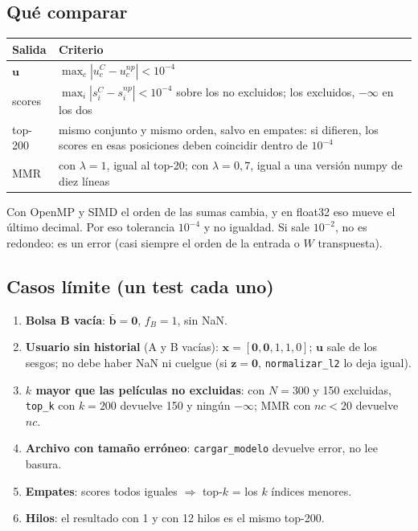 \documentclass[a4paper,11pt]{article}
\newcommand{\cod}[1]{\texttt{#1}}
\begin{document}
\subsection{Qué comparar}
\begin{center}
\begin{tabularx}{\linewidth}{lY}
\toprule
Salida & Criterio \\
\midrule
$\mathbf{u}$ & $\max_c |u^C_c - u^{np}_c| < 10^{-4}$ \\
scores & $\max_i |s^C_i - s^{np}_i| < 10^{-4}$ sobre los no excluidos; los excluidos, $-\infty$ en los dos \\
top-200 & mismo conjunto y mismo orden, salvo en empates: si difieren, los scores en esas posiciones deben coincidir dentro de $10^{-4}$ \\
MMR & con $\lambda = 1$, igual al top-20; con $\lambda = 0{,}7$, igual a una versión numpy de diez líneas \\
\bottomrule
\end{tabularx}
\end{center}
\begin{idea}
Con OpenMP y SIMD el orden de las sumas cambia, y en float32 eso mueve el último decimal. Por eso tolerancia $10^{-4}$
y no igualdad. Si sale $10^{-2}$, no es redondeo: es un error (casi siempre el orden de la entrada o $W$ transpuesta).
\end{idea}

\subsection{Casos límite (un test cada uno)}
\begin{enumerate}
  \item \textbf{Bolsa B vacía}: $\bar{\mathbf{b}} = \mathbf{0}$, $f_B = 1$, sin NaN.
  \item \textbf{Usuario sin historial} (A y B vacías): $\mathbf{x} = [\mathbf{0},\mathbf{0},1,1,0]$; $\mathbf{u}$ sale
        de los sesgos; no debe haber NaN ni cuelgue (si $\mathbf{z} = \mathbf{0}$, \cod{normalizar\_l2} lo deja igual).
  \item \textbf{$k$ mayor que las películas no excluidas}: con $N = 300$ y 150 excluidas, \cod{top\_k} con $k = 200$
        devuelve 150 y ningún $-\infty$; MMR con $nc < 20$ devuelve $nc$.
  \item \textbf{Archivo con tamaño erróneo}: \cod{cargar\_modelo} devuelve error, no lee basura.
  \item \textbf{Empates}: scores todos iguales $\Rightarrow$ top-$k$ = los $k$ índices menores.
  \item \textbf{Hilos}: el resultado con 1 y con 12 hilos es el mismo top-200.
\end{enumerate}
\end{document}

